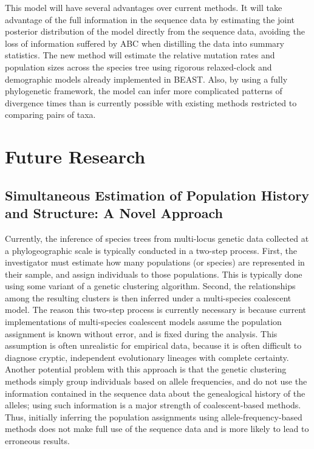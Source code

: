 \documentclass[10pt]{article}
\begin{document}
This model will have several advantages over current methods.
It will take advantage of the full information in the sequence data by
estimating the joint posterior distribution of the model directly from the
sequence data, avoiding the loss of information suffered by ABC when distilling
the data into summary statistics.
The new method will estimate the relative mutation rates and population sizes
across the species tree using rigorous relaxed-clock and demographic models
already implemented in BEAST.
Also, by using a fully phylogenetic framework, the model can infer more
complicated patterns of divergence times than is currently possible with
existing methods restricted to comparing pairs of taxa.

\section*{Future Research}


\subsection*{Simultaneous Estimation of Population History and Structure: A
Novel Approach}
Currently, the inference of species trees from multi-locus genetic data
collected at a phylogeographic scale is typically conducted in a two-step
process.
First, the investigator must estimate how many populations (or species) are
represented in their sample, and assign individuals to those populations.
This is typically done using some variant of a genetic clustering algorithm.
Second, the relationships among the resulting clusters is then inferred under a
multi-species coalescent model.
The reason this two-step process is currently necessary is because current
implementations of multi-species coalescent models assume the population
assignment is known without error, and is fixed during the analysis.
This assumption is often unrealistic for empirical data, because it is often
difficult to diagnose cryptic, independent evolutionary lineages with complete
certainty.
Another potential problem with this approach is that the genetic clustering
methods simply group individuals based on allele frequencies, and do not use
the information contained in the sequence data about the genealogical history
of the alleles; using such information is a major strength of coalescent-based
methods.
Thus, initially inferring the population assignments using
allele-frequency-based methods does not make full use of the sequence data and
is more likely to lead to erroneous results.
\end{document}
